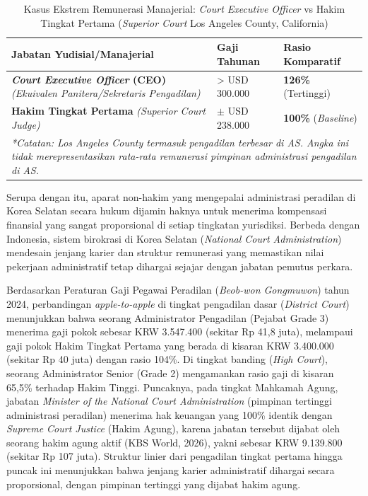 \documentclass[12pt, a4paper]{article}
\begin{document}
\begin{table}[H]
\centering
\fontsize{10}{12}\selectfont
\caption{Kasus Ekstrem Remunerasi Manajerial: \textit{Court Executive Officer} vs Hakim Tingkat Pertama (\textit{Superior Court} Los Angeles County, California)}
\label{tab:komparasi-california}
\renewcommand{\arraystretch}{1.4}
\begin{tabular}{p{6.5cm} p{3.5cm} p{4.0cm}}
\hline
\textbf{Jabatan Yudisial/Manajerial} & \textbf{Gaji Tahunan} & \textbf{Rasio Komparatif} \\
\hline
\raggedright\textbf{\textit{Court Executive Officer} (CEO)} \newline \textit{(Ekuivalen Panitera/Sekretaris Pengadilan)} & > USD 300.000 & \textbf{126\%} (Tertinggi) \\
\raggedright\textbf{Hakim Tingkat Pertama} \newline \textit{(Superior Court Judge)} & $\pm$ USD 238.000 & \textbf{100\%} (\textit{Baseline}) \\
\hline
\multicolumn{3}{p{14cm}}{\textit{*Catatan: Los Angeles County termasuk pengadilan terbesar di AS. Angka ini tidak merepresentasikan rata-rata remunerasi pimpinan administrasi pengadilan di AS.}} \\
\hline
\end{tabular}
\end{table}

Serupa dengan itu, aparat non-hakim yang mengepalai administrasi peradilan di Korea Selatan secara hukum dijamin haknya untuk menerima kompensasi finansial yang sangat proporsional di setiap tingkatan yurisdiksi. Berbeda dengan Indonesia, sistem birokrasi di Korea Selatan (\textit{National Court Administration}) mendesain jenjang karier dan struktur remunerasi yang memastikan nilai pekerjaan administratif tetap dihargai sejajar dengan jabatan pemutus perkara.

Berdasarkan Peraturan Gaji Pegawai Peradilan (\textit{Beob-won Gongmuwon}) tahun 2024, perbandingan \textit{apple-to-apple} di tingkat pengadilan dasar (\textit{District Court}) menunjukkan bahwa seorang Administrator Pengadilan (Pejabat Grade 3) menerima gaji pokok sebesar KRW 3.547.400 (sekitar Rp 41,8 juta), melampaui gaji pokok Hakim Tingkat Pertama yang berada di kisaran KRW 3.400.000 (sekitar Rp 40 juta) dengan rasio 104\%. Di tingkat banding (\textit{High Court}), seorang Administrator Senior (Grade 2) mengamankan rasio gaji di kisaran 65,5\% terhadap Hakim Tinggi. Puncaknya, pada tingkat Mahkamah Agung, jabatan \textit{Minister of the National Court Administration} (pimpinan tertinggi administrasi peradilan) menerima hak keuangan yang 100\% identik dengan \textit{Supreme Court Justice} (Hakim Agung), karena jabatan tersebut dijabat oleh seorang hakim agung aktif (KBS World, 2026), yakni sebesar KRW 9.139.800 (sekitar Rp 107 juta). Struktur linier dari pengadilan tingkat pertama hingga puncak ini menunjukkan bahwa jenjang karier administratif dihargai secara proporsional, dengan pimpinan tertinggi yang dijabat hakim agung.
\end{document}
